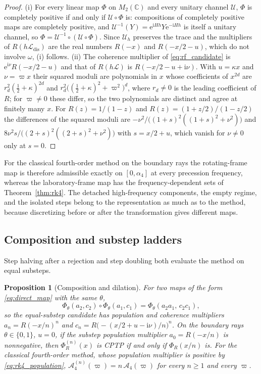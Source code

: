 \documentclass[pdflatex,sn-mathphys-num]{sn-jnl}
\newcommand{\e}{\mathrm{e}}
\newcommand{\ii}{\mathrm{i}}
\newcommand{\Adm}{\mathcal A}
\newcommand{\Lgen}{\mathcal L}
\newcommand{\Ldis}{\mathcal L_{\mathrm{dis}}}
\newcommand{\Uh}{\mathcal U}
\theoremstyle{thmstyleone}
\newtheorem{proposition}[theorem]{Proposition}
\theoremstyle{thmstylethree}
\theoremstyle{thmstyletwo}
\begin{document}
\begin{proof}
(i) For every linear map $\Phi$ on $M_2(\mathbb C)$ and every unitary channel $\Uh$, $\Phi$ is completely positive if and only if $\Uh\circ\Phi$ is: compositions of completely positive maps are completely positive, and $\Uh^{-1}(Y)=\e^{\ii Hh}Y\e^{-\ii Hh}$ is itself a unitary channel, so $\Phi=\Uh^{-1}\circ(\Uh\circ\Phi)$. Since $\Uh_h$ preserves the trace and the multipliers of $R(h\Ldis)$ are the real numbers $R(-x)$ and $R(-x/2-u)$, which do not involve $\omega$, (i) follows. (ii) The coherence multiplier of \eqref{eq:rf_candidate} is $\e^{\ii\nu}R(-x/2-u)$ and that of $R(h\Lgen)$ is $R(-x/2-u+\ii\nu)$. With $u=\kappa x$ and $\nu=\varpi x$ their squared moduli are polynomials in $x$ whose coefficients of $x^{2d}$ are $r_d^2(\tfrac12+\kappa)^{2d}$ and $r_d^2\big((\tfrac12+\kappa)^2+\varpi^2\big)^d$, where $r_d\ne0$ is the leading coefficient of $R$; for $\varpi\ne0$ these differ, so the two polynomials are distinct and agree at finitely many $x$. For $R(z)=1/(1-z)$ and $R(z)=(1+z/2)/(1-z/2)$ the differences of the squared moduli are $-\nu^2/\big((1+s)^2((1+s)^2+\nu^2)\big)$ and $8\nu^2s/\big((2+s)^2((2+s)^2+\nu^2)\big)$ with $s=x/2+u$, which vanish for $\nu\ne0$ only at $s=0$.
\end{proof}

For the classical fourth-order method on the boundary rays the rotating-frame map is therefore admissible exactly on $[0,\alpha_4]$ at every precession frequency, whereas the laboratory-frame map has the frequency-dependent sets of Theorem~\ref{thm:rk4}. The detached high-frequency components, the empty regime, and the isolated steps belong to the representation as much as to the method, because discretizing before or after the transformation gives different maps.

\subsection{Composition and substep ladders}\label{sec:composition}

Step halving after a rejection and step doubling both evaluate the method on equal substeps.

\begin{proposition}[Composition and dilation]\label{prop:composition}
For two maps of the form \eqref{eq:direct_map} with the same $\theta$,
\begin{equation}
 \Phi_\theta(a_2,c_2)\circ\Phi_\theta(a_1,c_1)=\Phi_\theta(a_2a_1,\,c_2c_1),
 \label{eq:composition}
\end{equation}
so the equal-substep candidate has population and coherence multipliers ${a_n=R(-x/n)^n}$ and ${c_n=R\bigl(-(x/2+u-\ii\nu)/n\bigr)^n}$. On the boundary rays $\theta\in\{0,1\}$, $u=0$, if the substep population multiplier $a_0=R(-x/n)$ is nonnegative, then $\Phi_R^{(n)}(x)$ is CPTP if and only if $\Phi_R(x/n)$ is. For the classical fourth-order method, whose population multiplier is positive by \eqref{eq:rk4_population}, $\Adm_4^{(n)}(\varpi)=n\,\Adm_4(\varpi)$ for every $n\ge1$ and every $\varpi$.
\end{proposition}
\end{document}
